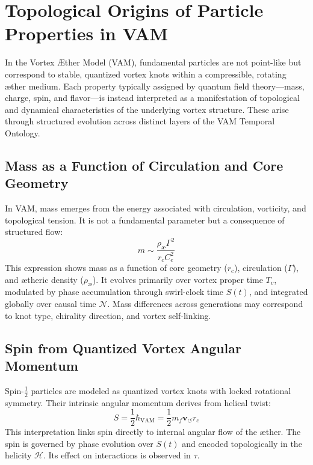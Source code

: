\section{Topological Origins of Particle Properties in VAM}

In the Vortex \AE{}ther Model (VAM), fundamental particles are not point-like but correspond to stable, quantized vortex knots within a compressible, rotating \ae{}ther medium. Each property typically assigned by quantum field theory---mass, charge, spin, and flavor---is instead interpreted as a manifestation of topological and dynamical characteristics of the underlying vortex structure. These arise through structured evolution across distinct layers of the VAM Temporal Ontology.

\subsection{Mass as a Function of Circulation and Core Geometry}

In VAM, mass emerges from the energy associated with circulation, vorticity, and topological tension. It is not a fundamental parameter but a consequence of structured flow:
\[
m \sim \frac{\rho_\text{\ae} \Gamma^2}{r_c C_e^2}
\]
This expression shows mass as a function of core geometry ($r_c$), circulation ($\Gamma$), and \ae{}theric density ($\rho_\text{\ae}$). It evolves primarily over vortex proper time $T_v$, modulated by phase accumulation through swirl-clock time $S(t)$, and integrated globally over causal time $\mathcal{N}$. Mass differences across generations may correspond to knot type, chirality direction, and vortex self-linking.

\subsection{Spin from Quantized Vortex Angular Momentum}

Spin-$\tfrac{1}{2}$ particles are modeled as quantized vortex knots with locked rotational symmetry. Their intrinsic angular momentum derives from helical twist:
\begin{equation}
S = \frac{1}{2} \hbar_\text{VAM} = \frac{1}{2} m_f \mathbf{v}_{\scriptscriptstyle\boldsymbol{\circlearrowleft}} r_c
\end{equation}
This interpretation links spin directly to internal angular flow of the \ae{}ther. The spin is governed by phase evolution over $S(t)$ and encoded topologically in the helicity $\mathcal{H}$. Its effect on interactions is observed in $\tau$.

